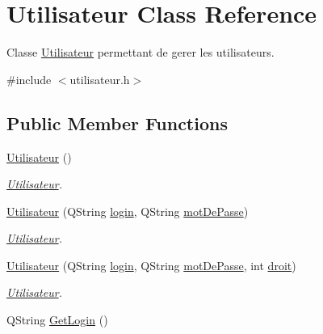\hypertarget{class_utilisateur}{}\section{Utilisateur Class Reference}
\label{class_utilisateur}


Classe \mbox{\hyperlink{class_utilisateur}{Utilisateur}} permettant de gerer les utilisateurs.  




{\ttfamily \#include $<$utilisateur.\+h$>$}

\subsection*{Public Member Functions}
\begin{DoxyCompactItemize}
\item 
\mbox{\label{class_utilisateur_ae76433a6d353c5f5ad0c6a6af64022ad}} 
\mbox{\hyperlink{class_utilisateur_ae76433a6d353c5f5ad0c6a6af64022ad}{Utilisateur}} ()
\begin{DoxyCompactList}\small\item\em \mbox{\hyperlink{class_utilisateur}{Utilisateur}}. \end{DoxyCompactList}\item 
\mbox{\hyperlink{class_utilisateur_a9c279c4e14b76e43412e1480f3cfa07e}{Utilisateur}} (Q\+String \mbox{\hyperlink{class_utilisateur_abb16ed370d845def5c476b79ea415dba}{login}}, Q\+String \mbox{\hyperlink{class_utilisateur_a4f6a17d0fb5c231bcb414396236a056f}{mot\+De\+Passe}})
\begin{DoxyCompactList}\small\item\em \mbox{\hyperlink{class_utilisateur}{Utilisateur}}. \end{DoxyCompactList}\item 
\mbox{\hyperlink{class_utilisateur_a14ac7e9bd12689670dc386393f86045f}{Utilisateur}} (Q\+String \mbox{\hyperlink{class_utilisateur_abb16ed370d845def5c476b79ea415dba}{login}}, Q\+String \mbox{\hyperlink{class_utilisateur_a4f6a17d0fb5c231bcb414396236a056f}{mot\+De\+Passe}}, int \mbox{\hyperlink{class_utilisateur_ac4f7dfce4243768a6eabfbb57b883cdf}{droit}})
\begin{DoxyCompactList}\small\item\em \mbox{\hyperlink{class_utilisateur}{Utilisateur}}. \end{DoxyCompactList}\item 
Q\+String \mbox{\hyperlink{class_utilisateur_a3b830246e73edd798e0945e3b9904b93}{Get\+Login}} ()

\end{DoxyCompactItemize}
